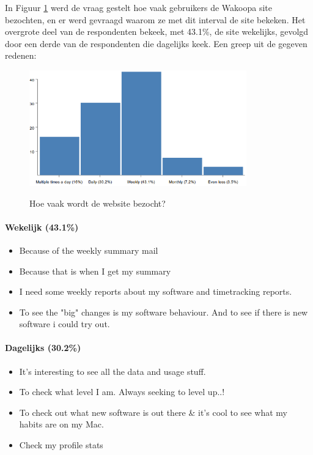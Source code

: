 \documentclass[a4paper, 10pt, pdftex]{report}
\begin{document}
      In Figuur \ref{fig:visit-website} werd de vraag gestelt hoe vaak gebruikers de Wakoopa site bezochten, en er werd gevraagd waarom ze met dit interval de site bekeken. Het overgrote deel van de respondenten bekeek, met 43.1\%, de site wekelijks, gevolgd door een derde van de respondenten die dagelijks keek. Een greep uit de gegeven redenen:
        \begin{figure}
          \begin{center}
          \caption{Hoe vaak wordt de website bezocht?}
            \includegraphics[height=50mm]{../images/enquete/visit-website}
          \label{fig:visit-website}
          \end{center}
        \end{figure}

      \paragraph{Wekelijk (43.1\%)}
        \begin{itemize}
          \item Because of the weekly summary mail
          \item Because that is when I get my summary
          \item I need some weekly reports about my software and timetracking reports.
          \item To see the "big" changes is my software behaviour. And to see if there is new software i could try out.
        \end{itemize}

      \paragraph{Dagelijks (30.2\%)}
        \begin{itemize}
          \item It's interesting to see all the data and usage stuff.
          \item To check what level I am. Always seeking to level up..!
          \item To check out what new software is out there \& it's cool to see what my habits are on my Mac.
          \item Check my profile stats
        \end{itemize}
\end{document}
